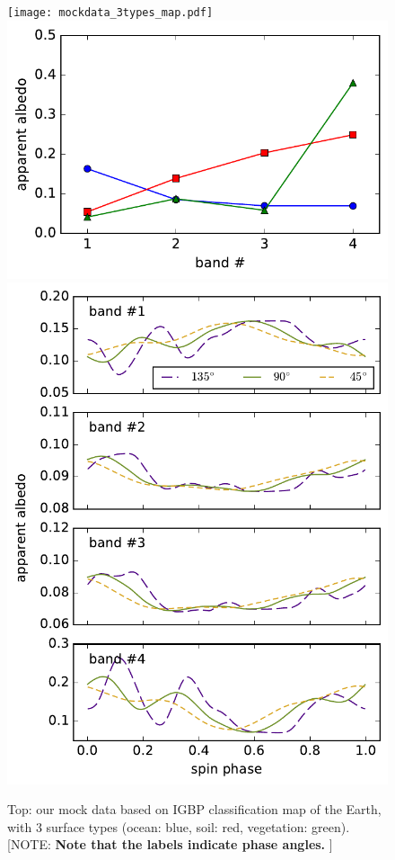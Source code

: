 \documentclass[iop,numberedappendix,apj,]{emulateapj}
\def\memoYF#1{\color{red}[NOTE: {\bf #1}]\color{black}}
\begin{document}
\begin{figure}[t]
    \begin{center}
	\texttt{[image: mockdata\_3types\_map.pdf]}
    \includegraphics[width=\hsize]{mockdata_3types_albd.pdf}
	\includegraphics[width=\hsize]{mockdata_3types_t360_lc.pdf}
    \end{center}
    \caption{Top: our mock data based on IGBP classification map of the Earth, with 3 surface types (ocean: blue, soil: red, vegetation: green). \memoYF{Note that the labels indicate phase angles. }}
\label{fig:mockdata}
\end{figure}
\end{document}
